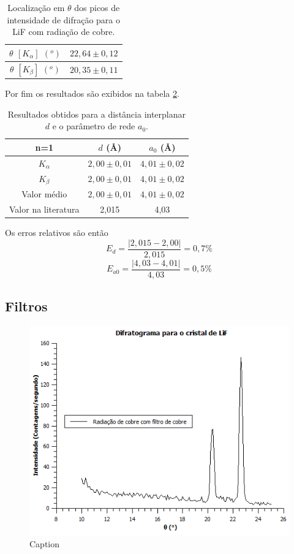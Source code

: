 \documentclass[article,12pt,openright,oneside,a4paper,brazil]{abntex2}
\begin{document}
\begin{table}[H]
    \centering
    \caption{Localização em $\theta$ dos picos de intensidade de difração para o LiF com radiação de cobre.}
    \begin{tabular}{|c|c|}
        \hline
        $\theta$ $[K_\alpha]$ $(^o)$ & $22,64\pm0,12$ \\ \hline
        $\theta$ $[K_\beta]$ $(^o)$ & $20,35\pm0,11$ \\ \hline
    \end{tabular}
    \label{tab:dLiF}
\end{table}

Por fim os resultados são exibidos na tabela \ref{tab:LiF}.

\begin{table}[H]
    \centering
    \caption{Resultados obtidos para a distância interplanar $d$ e o parâmetro de rede $a_0$.}
    \begin{tabular}{|c|c|c|}
        \hline
        n=1 & $d$ (\r{A}) & $a_0$ (\r{A}) \\ \hline
        $K_\alpha$ & $2,00\pm0,01$ & $4,01\pm0,02$ \\ \hline
        $K_\beta$ & $2,00\pm0,01$ & $4,01\pm0,02$ \\ \hline
        Valor médio & $2,00\pm0,01$ & $4,01\pm0,02$ \\ \hline
        Valor na literatura & 2,015 & 4,03 \\ \hline
    \end{tabular}
    \label{tab:LiF}
\end{table}

Os erros relativos são então
$$E_d=\frac{|2,015-2,00|}{2,015}=0,7\%$$
$$E_{a0}=\frac{|4,03-4,01|}{4,03}=0,5\%$$

\subsection{Filtros}

\begin{figure}[H]
    \centering
    \includegraphics[scale=0.8]{Figuras/FiltroCu.png}
    \caption{Caption}
    \label{fig:my_label}
\end{figure}
\end{document}
